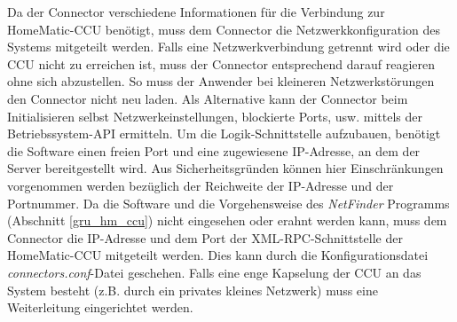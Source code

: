 Da der Connector verschiedene Informationen für die Verbindung zur HomeMatic-CCU benötigt,
muss dem Connector die Netzwerkkonfiguration des Systems mitgeteilt werden.
Falls eine Netzwerkverbindung getrennt wird oder die CCU nicht zu erreichen ist, muss der Connector
entsprechend darauf reagieren ohne sich abzustellen.
So muss der Anwender bei kleineren Netzwerkstörungen den Connector nicht neu laden.
Als Alternative kann der Connector beim Initialisieren selbst Netzwerkeinstellungen,
blockierte Ports, usw. mittels der Betriebssystem-API ermitteln.
Um die Logik-Schnittstelle aufzubauen, benötigt die Software einen freien Port und
eine zugewiesene IP-Adresse, an dem der Server bereitgestellt wird.
Aus Sicherheitsgründen können hier Einschränkungen vorgenommen werden bezüglich
der Reichweite der IP-Adresse und der Portnummer.
Da die Software und die Vorgehensweise des \emph{NetFinder} Programms (Abschnitt \ref{gru_hm_ccu})
nicht eingesehen oder erahnt werden kann, muss dem Connector die IP-Adresse und
dem Port der XML-RPC-Schnittstelle der HomeMatic-CCU mitgeteilt werden.
Dies kann durch die Konfigurationsdatei \emph{connectors.conf}-Datei geschehen.
Falls eine enge Kapselung der CCU an das System besteht (z.B. durch ein privates
kleines Netzwerk) muss eine Weiterleitung eingerichtet werden.


